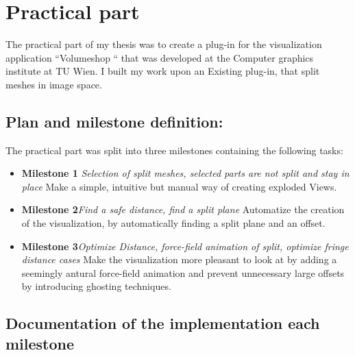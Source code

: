\chapter{Practical part}
The practical part of my thesis was to create a plug-in for the visualization application ``Volumeshop `` that was developed at the Computer graphics institute at TU Wien. I built my work upon an Existing plug-in, that split meshes in image space.
\section{Plan and milestone definition:}
The practical part was split into three milestones containing the following tasks:
\begin{itemize}
\item \textbf{Milestone 1} \emph{Selection of split meshes, selected parts are not split and stay in place} Make a simple, intuitive but manual way of creating exploded Views.
\item \textbf{Milestone 2}\emph{Find a safe distance, find a split plane} Automatize the creation of the visualization, by automatically finding a split plane and an offset.
\item \textbf{Milestone 3}\emph{Optimize Distance, force-field animation of split, optimize fringe distance cases} Make the visualization more pleasant to look at by adding a seemingly antural force-field animation and prevent unnecessary large offsets by introducing ghosting techniques.
\end{itemize}
\section{Documentation of the implementation each milestone}
